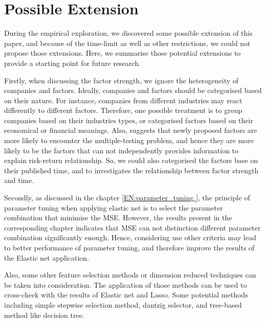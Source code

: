 \section{Possible Extension}
During the empirical exploration, we discovered some possible extension of this paper, and because of the time-limit as well as other restrictions, we could not propose those extensions.
Here, we summarise those potential extensions to provide a starting point for future research.

Firstly, when discussing the factor strength, we ignore the heterogeneity of companies and factors.
Ideally, companies and factors should be categorised based on their nature.
For instance, companies from different industries may react differently to different factors.
Therefore, one possible treatment is to group companies based on their industries types, or categorised factors based on their economical or financial meanings.
Also,  suggests that newly proposed factors are more likely to encounter the multiple-testing problem, and hence they are more likely to be the factors that can not independently provides information to explain risk-return relationship.
So, we could also categorised the factors base on their published time, and to investigates the relationship between factor strength and time.

Secondly, as discussed in the chapter \ref{EN:parameter_tuning }, the principle of parameter tuning when applying elastic net is to select the parameter combination that minimise the MSE.
However, the results present in the corresponding chapter indicates that MSE can not distinction different parameter combination significantly enough.
Hence, considering use other criteria may lead to better performance of parameter tuning, and therefore improve the results of the Elastic net application.

Also, some other feature selection methods or dimension reduced techniques can be taken into consideration.
The application of those methods can be used to cross-check with the results of Elastic net and Lasso.
Some potential methods including simple stepwise selection method, dantzig selector, and tree-based method like decision tree.

